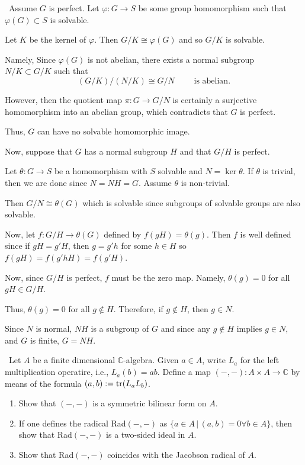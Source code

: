 \documentclass[12pt]{AlgebraQual}
\begin{document}
\begin{solution}$\,$
Assume $G$ is perfect. Let $\varphi:G\to S$ be some group homomorphism such that $\varphi(G)\subset S$ is solvable.

Let $K$ be the kernel of $\varphi$. Then $G/K\cong\varphi(G)$ and so $G/K$ is solvable.

Namely, Since $\varphi(G)$ is not abelian, there exists a normal subgroup $N/K\subset G/K$ such that $$(G/K)/(N/K)\cong G/N\qquad\text{ is abelian}.$$

However, then the quotient map $\pi:G\to G/N$ is certainly a surjective homomorphism into an abelian group, which contradicts that $G$ is perfect.

Thus, $G$ can have no solvable homomorphic image.

Now, suppose that $G$ has a normal subgroup $H$ and that $G/H$ is perfect.

Let $\theta:G\to S$ be a homomorphism with $S$ solvable and $N=\ker\theta$. If $\theta$ is trivial, then we are done since $N=NH=G$. Assume $\theta$ is non-trivial.

Then $G/N\cong\theta(G)$ which is solvable since subgroups of solvable groups are also solvable.

Now, let $f:G/H\to\theta(G)$ defined by $f(gH)=\theta(g)$. Then $f$ is well defined since if $gH=g'H$, then $g=g'h$ for some $h\in H$ so $f(gH)=f(g'hH)=f(g'H)$.

Now, since $G/H$ is perfect, $f$ must be the zero map. Namely, $\theta(g)=0$ for all $gH\in G/H$.

Thus, $\theta(g)=0$ for all $g\notin H$. Therefore, if $g\notin H$, then $g\in N$.

Since $N$ is normal, $NH$ is a subgroup of $G$ and since any $g\notin H$ implies $g\in N$, and $G$ is finite, $G=NH$.
\end{solution}
\newpage



\begin{problem} $\,$
Let $A$ be a finite dimensional $\mathbb{C}$-algebra. Given $a\in A$, write $L_a$ for the left multiplication operatire, i.e., $L_a(b)=ab.$ Define a map $(-,-):A\times A\to\mathbb{C}$ by means of the formula $(a,b):=\text{tr}(L_aL_b)$.
\begin{enumerate}[label=(\alph*)]
    \item Show that $(-,-)$ is a symmetric bilinear form on $A.$
    \item If one defines the radical Rad$(-,-)$ as $\{a\in A\,|\,(a,b)=0 \forall b\in A\}$, then show that Rad$(-,-)$ is a two-sided ideal in $A$.
    \item Show that Rad$(-,-)$ coincides with the Jacobson radical of $A$.
\end{enumerate}
\end{problem}
\end{document}
